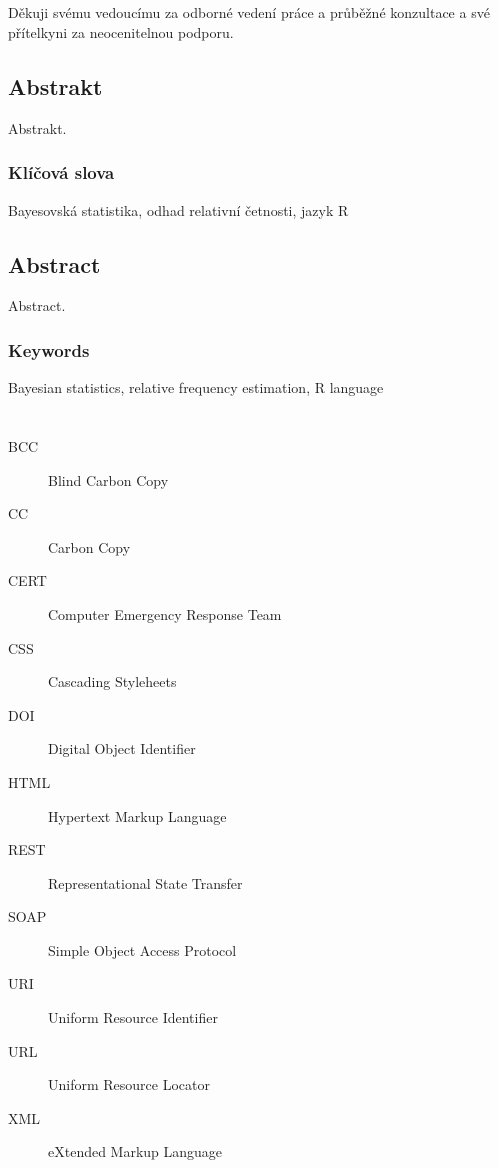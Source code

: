 \documentclass[
  11pt,
  a4paper]{report}
\let\openright=\clearpage
\def\Podekovani{%
Děkuji svému vedoucímu za odborné vedení práce a průběžné konzultace a své přítelkyni za neocenitelnou podporu.
}
\def\Abstrakt{%
Abstrakt.
}
\def\AbstraktEN{%
Abstract.
}
\def\KlicovaSlova{Bayesovská statistika, odhad relativní četnosti, jazyk R}
\def\KlicovaSlovaEN{Bayesian statistics, relative frequency estimation, R language}
\begin{document}
\hypersetup{pageanchor=true}
\cleardoublepage
\pagestyle{plain}
\openright
\vspace*{\fill}
\section*{\PodekovaniText}
\noindent
\Podekovani
\vspace{1cm}


\openright
\section*{Abstrakt}
\noindent
\Abstrakt
\subsection*{Klíčová slova}
\noindent
\KlicovaSlova

\bigskip\bigskip\bigskip\bigskip\bigskip
\section*{Abstract}
\noindent
\AbstraktEN
\subsection*{Keywords}
\noindent
\KlicovaSlovaEN

\openright

\setcounter{tocdepth}{2}
\tableofcontents

\openright
\listoffigures

\clearpage
\listoftables

\clearpage
\lstlistoflistings

\chapter*{\SeznamZkratek}

\begin{multicols}{2}
\raggedright
\begin{description}
\item [BCC] Blind Carbon Copy
\item [CC] Carbon Copy
\item [CERT] Computer Emergency Response Team
\item [CSS] Cascading Styleheets
\item [DOI] Digital Object Identifier
\item [HTML] Hypertext Markup Language
\item [REST] Representational State Transfer
\item [SOAP] Simple Object Access Protocol
\item [URI] Uniform Resource Identifier
\item [URL] Uniform Resource Locator
\item [XML] eXtended Markup Language
\end{description}
\end{multicols}
\end{document}
